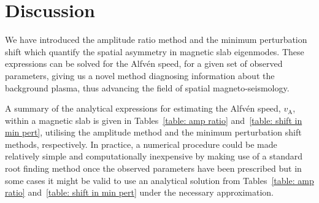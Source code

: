 \documentclass[namedreferences]{solarphysics}
\numberwithin{equation}{section}
\begin{document}
\begin{article}
\begin{landscape}
\end{landscape}

\section{Discussion} \label{sec: discussion}

We have introduced the amplitude ratio method and the minimum perturbation shift which quantify the spatial asymmetry in magnetic slab eigenmodes. These expressions can be solved for the Alfv\'{e}n speed, for a given set of observed parameters, giving us a novel method diagnosing information about the background plasma, thus advancing the field of spatial magneto-seismology.

A summary of the analytical expressions for estimating the Alfv\'{e}n speed, $v_\textrm{A}$, within a magnetic slab is given in Tables~\ref{table: amp ratio} and~\ref{table: shift in min pert}, utilising the amplitude method and the minimum perturbation shift methods, respectively. In practice, a numerical procedure could be made relatively simple and computationally inexpensive by making use of a standard root finding method once the observed parameters have been prescribed but in some cases it might be valid to use an analytical solution from Tables~\ref{table: amp ratio} and~\ref{table: shift in min pert} under the necessary approximation.


\end{article}
\end{document}
